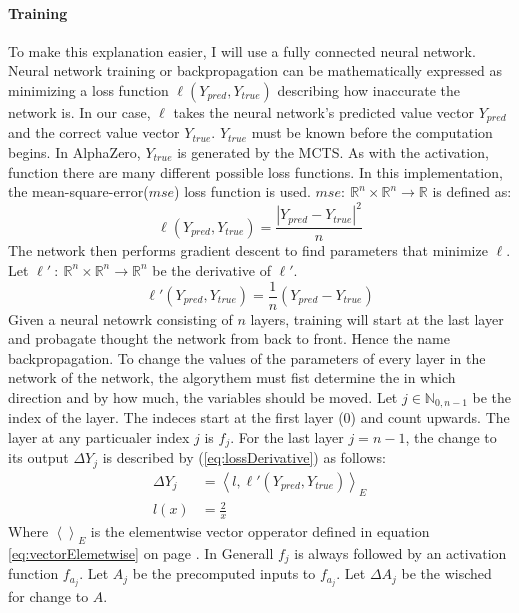 \documentclass[12pt]{article}
\newcommand{\equationref}[1]{equation \ref{#1} on page \pageref{#1}}
\newcommand{\quckeq}[1]{(\ref{#1})}
\newcommand{\quickeq}[1]{\quckeq{#1}}
\begin{document}
\paragraph{Training} 
To make this explanation easier, I will use a fully connected neural network.
Neural network training or backpropagation can be mathematically expressed as minimizing a loss function  \(\ell(Y_{pred}, Y_{true})\) describing how inaccurate the network is. In our case, \(\ell\) takes the neural network's predicted value vector \(Y_{pred}\) and the correct value vector \(Y_{true}\). \(Y_{true}\) must be known before the computation begins. In AlphaZero, \(Y_{true}\) is generated by the MCTS. As with the activation, function there are many different possible loss functions. In this implementation, the mean-square-error(\(mse\)) loss function is used. \(mse:~\mathbb R^n\times\mathbb R^n \to \mathbb R\) is defined as:
\begin{equation} \label{eq:NN:loss_mse}
\ell(Y_{pred}, Y_{true}) = \frac{|Y_{pred} - Y_{true}|^2}{n}
\end{equation}
The network then performs gradient descent to find parameters that minimize \(\ell\).  Let \(\ell'~:~\mathbb R^n \times \mathbb R^n \to \mathbb R^n\) be the derivative of \(\ell'\).
\begin{equation}\label{eq:lossDerivative}
\ell'(Y_{pred}, Y_{true}) = \frac{1}{n} \left(Y_{pred} - Y_{true}\right)
\end{equation}
Given a neural netowrk consisting of \(n\) layers, training will start at the last layer and probagate thought the network from back to front. Hence the name backpropagation. To change the values of the parameters of every layer in the network of the network, the algorythem must fist determine the in which direction and by how much, the variables should be moved. Let \(j \in \mathbb N_{0,n-1}\) be the index of the layer. The indeces start at the first layer (0) and count upwards. The layer at any particualer index \(j\) is \(f_j\). For the last layer \(j=n-1\), the change to its output \(\Delta Y_j\) is described by \quickeq{eq:lossDerivative} as follows:
\begin{align}
\Delta Y_j &= \left<l, \ell'(Y_{pred}, Y_{true})\right>_E\\
l(x) &= \frac{2}{x}
\end{align}
Where \(\left<\right>_E\) is the elementwise vector opperator defined in \equationref{eq:vectorElemetwise}. In Generall \(f_j\) is always followed by an activation function \(f_{a_j}\). Let \(A_j\) be the precomputed inputs to \(f_{a_j}\). Let \(\Delta A_j\) be the wisched for change to \(A\).
\end{document}
